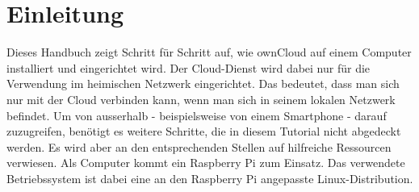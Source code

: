 \section{Einleitung}
Dieses Handbuch zeigt Schritt für Schritt auf, wie ownCloud auf einem Computer installiert und eingerichtet wird.
Der Cloud-Dienst wird dabei nur für die Verwendung im heimischen Netzwerk eingerichtet. Das bedeutet, dass man sich nur mit der Cloud verbinden kann, wenn man sich in seinem lokalen Netzwerk befindet. Um von ausserhalb - beispielsweise von einem Smartphone - darauf zuzugreifen, benötigt es weitere Schritte, die in diesem Tutorial nicht abgedeckt werden. Es wird aber an den entsprechenden Stellen auf hilfreiche Ressourcen verwiesen. Als Computer kommt ein Raspberry Pi zum Einsatz. Das verwendete Betriebssystem ist dabei eine an den Raspberry Pi angepasste Linux-Distribution.


